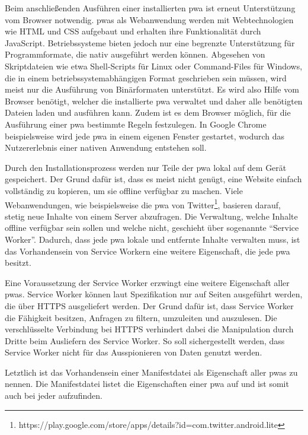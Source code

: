 \documentclass[12pt, parskip=half]{scrartcl}       %
\begin{document}
Beim anschließenden Ausführen einer installierten \ac{pwa} ist erneut Unterstützung vom Browser notwendig.
\acp{pwa} als Webanwendung werden mit Webtechnologien wie HTML und CSS aufgebaut und erhalten ihre Funktionalität durch JavaScript.
Betriebssysteme bieten jedoch nur eine begrenzte Unterstützung für Programmformate, die nativ ausgeführt werden können.
Abgesehen von Skriptdateien wie etwa Shell-Scripts für Linux oder Command-Files für Windows, die in einem betriebssystemabhängigen Format geschrieben sein müssen, wird meist nur die Ausführung von Binärformaten unterstützt\cite{fisher_executablelist}.
Es wird also Hilfe vom Browser benötigt, welcher die installierte \ac{pwa} verwaltet und daher alle benötigten Dateien laden und ausführen kann.
Zudem ist es dem Browser möglich, für die Ausführung einer \ac{pwa} bestimmte Regeln festzulegen.
In Google Chrome beispielsweise wird jede \ac{pwa} in einem eigenen Fenster gestartet, wodurch das Nutzererlebnis einer nativen Anwendung entstehen soll\cite{googledevs_pwa}.

Durch den Installationsprozess werden nur Teile der \ac{pwa} lokal auf dem Gerät gespeichert.
Der Grund dafür ist, dass es meist nicht genügt, eine Website einfach vollständig zu kopieren, um sie offline verfügbar zu machen.
Viele Webanwendungen, wie beispielsweise die \ac{pwa} von Twitter\footnote{https://play.google.com/store/apps/details?id=com.twitter.android.lite}, basieren darauf, stetig neue Inhalte von einem Server abzufragen.
Die Verwaltung, welche Inhalte offline verfügbar sein sollen und welche nicht, geschieht über sogenannte \enquote{Service Worker}.
Dadurch, dass jede \ac{pwa} lokale und entfernte Inhalte verwalten muss, ist das Vorhandensein von Service Workern eine weitere Eigenschaft, die jede \ac{pwa} besitzt.

Eine Voraussetzung der Service Worker erzwingt eine weitere Eigenschaft aller \acp{pwa}.
Service Worker können laut Spezifikation nur auf Seiten ausgeführt werden, die über HTTPS ausgeliefert werden.
Der Grund dafür ist, dass Service Worker die Fähigkeit besitzen, Anfragen zu filtern, umzuleiten und auszulesen.
Die verschlüsselte Verbindung bei HTTPS verhindert dabei die Manipulation durch Dritte beim Ausliefern des Service Worker.
So soll sichergestellt werden, dass Service Worker nicht für das Ausspionieren von Daten genutzt werden\cite{ServiceWorker_explained}.

Letztlich ist das Vorhandensein einer Manifestdatei als Eigenschaft aller \acp{pwa} zu nennen.
Die Manifestdatei listet die Eigenschaften einer \ac{pwa} auf und ist somit auch bei jeder aufzufinden.
\end{document}
